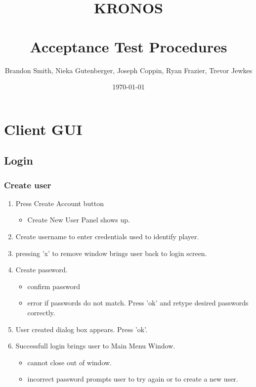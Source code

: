 \documentclass[11pt, titlepage]{article}
\author{Brandon Smith, Nieka Gutenberger, Joseph Coppin, Ryan Frazier, Trevor Jewkes}
\title{KRONOS\\ \\
		 Acceptance Test Procedures}
\date{\today}
\begin{document}
\maketitle
\setcounter{tocdepth}{1}


\section{Client GUI}

\subsection{Login}
\subsubsection{Create user}
\begin{enumerate}

	\item Press Create Account button
		\begin{itemize}
	      \item Create New User Panel shows up.
			\end{itemize}
	\item Create username to enter credentials used to identify player.
	\item pressing 'x' to remove window brings user back to login screen.
	\item Create password.
		\begin{itemize}
	      \item confirm password
	      \item error if passwords do not match.  Press 'ok' and retype desired passwords correctly.
	  \end{itemize}

	\item User created dialog box appears.  Press 'ok'.
	\item Successfull login brings user to Main Menu Window.
	      \begin{itemize}
	      	\item cannot close out of window.
	      	\item incorrect password prompts user to try again or to create a new user.
				\end{itemize}
\end{enumerate}
\end{document}

